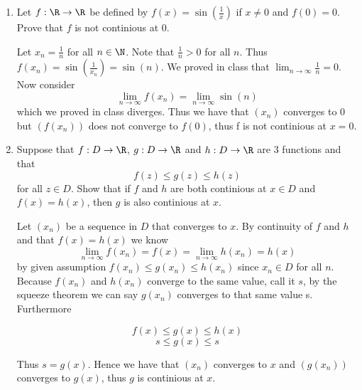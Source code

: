 \documentclass[11pt]{exam}
\begin{document}
    \begin{enumerate}
        \item Let $f: \R \to \R$ be defined by $f(x) = \sin\left(\frac{1}{x}\right)$ 
        if $x \neq 0$ and $f(0) = 0$. Prove that $f$ is not continious at 0.
            \begin{solution}
                Let $x_n = \frac{1}{n}$ for all $n \in \N$. Note that $\frac{1}{n} > 0$ for all $n$. Thus $f(x_n) = \sin\left(\frac{1}{x_n}\right) = \sin(n)$. We proved in class that $\lim_{n \to \infty} \frac{1}{n} = 0$. Now consider $$\lim_{n \to \infty} f(x_n) = \lim_{n \to \infty} \sin(n)$$ which we proved in class diverges. Thus we have that $(x_n)$ converges to $0$ but $(f(x_n))$ does not converge to $f(0)$, thus f is not continious at $x = 0$.
            \end{solution}
        \item Suppose that $f: D \to \R$, $g: D \to \R$ and $h: D \to \R$ are 3 functions and that $$f(z) \leq g(z) \leq h(z)$$ for all $z \in D$. Show that if $f$ and $h$ are both continious at $x \in D$ and $f(x) = h(x)$, then $g$ is also continious at $x$.
            \begin{solution}
                Let $(x_n)$ be a sequence in $D$ that converges to $x$. By continuity of $f$ and $h$ and that $f(x) = h(x)$ we know $$\lim_{n \to \infty} f(x_n) = f(x) = \lim_{n \to \infty} h(x_n) = h(x)$$
                by given assumption $f(x_n) \leq g(x_n) \leq h(x_n)$ since $x_n \in D$ for all $n$. Because $f(x_n)$ and $h(x_n)$ converge to the same value, call it $s$, by the squeeze theorem we can say $g(x_n)$ converges to that same value s. Furthermore 

                    $$f(x) \leq g(x) \leq h(x)$$ 
                    $$s \leq g(x) \leq s$$

                Thus $s = g(x)$. Hence we have that $(x_n)$ converges to $x$ and $(g(x_n))$ converges to $g(x)$, thus $g$ is continious at $x$. 


\end{solution}
\end{enumerate}
\end{document}
